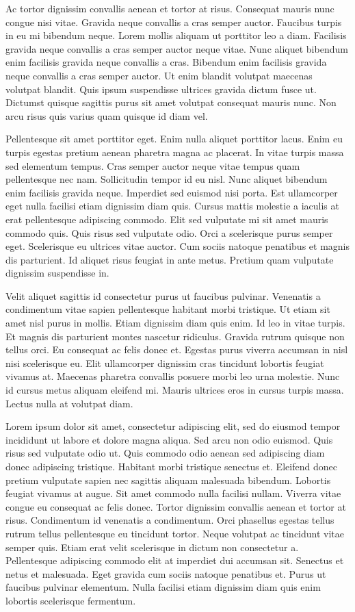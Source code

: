 Ac tortor dignissim convallis aenean et tortor at risus. Consequat mauris nunc
congue nisi vitae. Gravida neque convallis a cras semper auctor. Faucibus
turpis in eu mi bibendum neque. Lorem mollis aliquam ut porttitor leo a diam.
Facilisis gravida neque convallis a cras semper auctor neque vitae. Nunc
aliquet bibendum enim facilisis gravida neque convallis a cras. Bibendum enim
facilisis gravida neque convallis a cras semper auctor. Ut enim blandit
volutpat maecenas volutpat blandit. Quis ipsum suspendisse ultrices gravida
dictum fusce ut. Dictumst quisque sagittis purus sit amet volutpat consequat
mauris nunc. Non arcu risus quis varius quam quisque id diam vel.

Pellentesque sit amet porttitor eget. Enim nulla aliquet porttitor lacus. Enim
eu turpis egestas pretium aenean pharetra magna ac placerat. In vitae turpis
massa sed elementum tempus. Cras semper auctor neque vitae tempus quam
pellentesque nec nam. Sollicitudin tempor id eu nisl. Nunc aliquet bibendum
enim facilisis gravida neque. Imperdiet sed euismod nisi porta. Est ullamcorper
eget nulla facilisi etiam dignissim diam quis. Cursus mattis molestie a iaculis
at erat pellentesque adipiscing commodo. Elit sed vulputate mi sit amet mauris
commodo quis. Quis risus sed vulputate odio. Orci a scelerisque purus semper
eget. Scelerisque eu ultrices vitae auctor. Cum sociis natoque penatibus et
magnis dis parturient. Id aliquet risus feugiat in ante metus. Pretium quam
vulputate dignissim suspendisse in.

Velit aliquet sagittis id consectetur purus ut faucibus pulvinar. Venenatis a
condimentum vitae sapien pellentesque habitant morbi tristique. Ut etiam sit
amet nisl purus in mollis. Etiam dignissim diam quis enim. Id leo in vitae
turpis. Et magnis dis parturient montes nascetur ridiculus. Gravida rutrum
quisque non tellus orci. Eu consequat ac felis donec et. Egestas purus viverra
accumsan in nisl nisi scelerisque eu. Elit ullamcorper dignissim cras tincidunt
lobortis feugiat vivamus at. Maecenas pharetra convallis posuere morbi leo urna
molestie. Nunc id cursus metus aliquam eleifend mi. Mauris ultrices eros in
cursus turpis massa. Lectus nulla at volutpat diam.

Lorem ipsum dolor sit amet, consectetur adipiscing elit, sed do eiusmod tempor
incididunt ut labore et dolore magna aliqua. Sed arcu non odio euismod. Quis
risus sed vulputate odio ut. Quis commodo odio aenean sed adipiscing diam donec
adipiscing tristique. Habitant morbi tristique senectus et. Eleifend donec
pretium vulputate sapien nec sagittis aliquam malesuada bibendum. Lobortis
feugiat vivamus at augue. Sit amet commodo nulla facilisi nullam. Viverra vitae
congue eu consequat ac felis donec. Tortor dignissim convallis aenean et tortor
at risus. Condimentum id venenatis a condimentum. Orci phasellus egestas tellus
rutrum tellus pellentesque eu tincidunt tortor. Neque volutpat ac tincidunt
vitae semper quis. Etiam erat velit scelerisque in dictum non consectetur a.
Pellentesque adipiscing commodo elit at imperdiet dui accumsan sit. Senectus et
netus et malesuada. Eget gravida cum sociis natoque penatibus et. Purus ut
faucibus pulvinar elementum. Nulla facilisi etiam dignissim diam quis enim
lobortis scelerisque fermentum.

